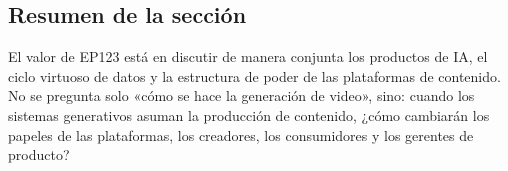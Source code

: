 \subsection{Resumen de la sección}

El valor de EP123 está en discutir de manera conjunta los productos de IA, el ciclo virtuoso de datos y la estructura de poder de las plataformas de contenido. No se pregunta solo «cómo se hace la generación de video», sino: cuando los sistemas generativos asuman la producción de contenido, ¿cómo cambiarán los papeles de las plataformas, los creadores, los consumidores y los gerentes de producto?
